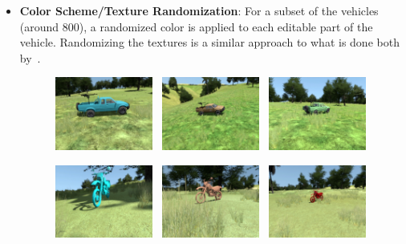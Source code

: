 \begin{itemize}
    \item \textbf{Color Scheme/Texture Randomization}: For a subset of the vehicles (around 800), a randomized color is applied to each editable part of the vehicle. Randomizing the textures is a similar approach to what is done both by~\textcite{domainrandcars, structureddomainrandomization}.
    
    \begin{figure}[H]
    \centering
      {\includegraphics[height=2.4cm, width=3.4cm]{images/vbs3/color-scheme/car/example4-1.jpg}}
      {\includegraphics[height=2.4cm, width=3.4cm]{images/vbs3/color-scheme/car/example4-2.jpg}}
      {\includegraphics[height=2.4cm, width=3.4cm]{images/vbs3/color-scheme/car/example4-3.jpg}}
      
      {\includegraphics[height=2.4cm, width=3.4cm]{images/vbs3/color-scheme/bike/example4-4.jpg}}
      {\includegraphics[height=2.4cm, width=3.4cm]{images/vbs3/color-scheme/bike/example4-5.jpg}}
      {\includegraphics[height=2.4cm, width=3.4cm]{images/vbs3/color-scheme/bike/example4-6.jpg}}
      

\end{figure}
\end{itemize}
